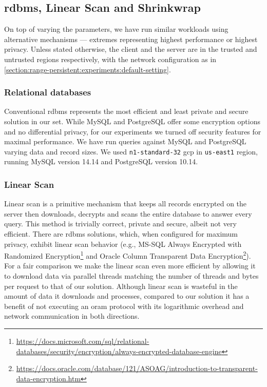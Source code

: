 	\subsection{\texorpdfstring{\acrshort{rdbms}}{RDBMS}, Linear Scan and Shrinkwrap}

		On top of varying the parameters, we have run similar workloads using alternative mechanisms --- extremes representing highest performance or highest privacy.
		Unless stated otherwise, the client and the server are in the trusted and untrusted regions respectively, with the network configuration as in \cref{section:range-persistent:experiments:default-setting}.

		\subsubsection*{Relational databases}

			Conventional \acrshort{rdbms} represents the most efficient and least private and secure solution in our set.
			While MySQL and PostgreSQL offer some encryption options and no differential privacy, for our experiments we turned off security features for maximal performance.
			We have run queries against MySQL and PostgreSQL varying data and record sizes.
			We used \texttt{n1-standard-32} \acrshort{gcp}  in \texttt{us-east1} region, running MySQL version 14.14 and PostgreSQL version 10.14.

		\subsubsection*{Linear Scan}

			Linear scan is a primitive mechanism that keeps all records encrypted on the server then downloads, decrypts and scans the entire database to answer every query.
			This method is trivially correct, private and secure, albeit not very efficient.
			There are \acrshort{rdbms} solutions, which, when configured for maximum privacy, exhibit linear scan behavior (e.g., MS-SQL Always Encrypted with Randomized Encryption\footnote{\url{https://docs.microsoft.com/sql/relational-databases/security/encryption/always-encrypted-database-engine}} and Oracle Column Transparent Data Encryption\footnote{\url{https://docs.oracle.com/database/121/ASOAG/introduction-to-transparent-data-encryption.htm}}).
			For a fair comparison we make the linear scan even more efficient by allowing it to download data via parallel threads matching the number of threads and bytes per request to that of our solution.
			Although linear scan is wasteful in the amount of data it downloads and processes, compared to our solution it has a benefit of not executing an \acrshort{oram} protocol with its logarithmic overhead and network communication in both directions.

